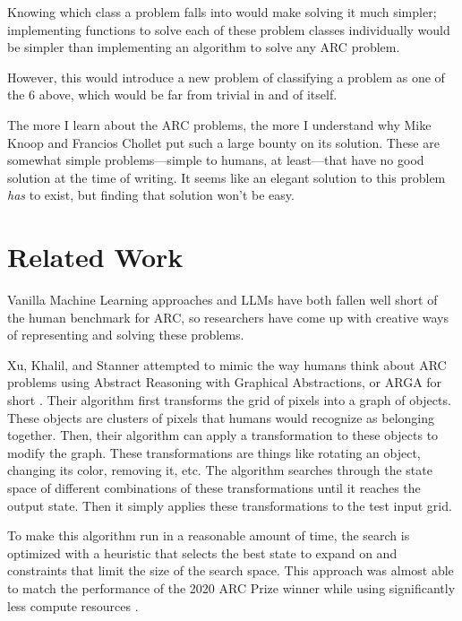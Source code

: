 \documentclass[letterpaper]{article} %
\begin{document}
Knowing which class a problem falls into would make solving it much simpler; implementing functions to solve each of these problem classes individually would be simpler than implementing an algorithm to solve any ARC problem.

However, this would introduce a new problem of classifying a problem as one of the 6 above, which would be far from trivial in and of itself.

\bigskip

The more I learn about the ARC problems, the more I understand why Mike Knoop and Francios Chollet put such a large bounty on its solution. These are somewhat simple problems---simple to humans, at least---that have no good solution at the time of writing. It seems like an elegant solution to this problem \textit{has} to exist, but finding that solution won't be easy.

\section{Related Work}
Vanilla Machine Learning approaches and LLMs have both fallen well short of the human benchmark for ARC, so researchers have come up with creative ways of representing and solving these problems.

\bigskip

Xu, Khalil, and Stanner attempted to mimic the way humans think about ARC problems using Abstract Reasoning with Graphical Abstractions, or ARGA for short \cite{Xu_Khalil_Sanner_2023}. Their algorithm first transforms the grid of pixels into a graph of objects. These objects are clusters of pixels that humans would recognize as belonging together. Then, their algorithm can apply a transformation to these objects to modify the graph. These transformations are things like rotating an object, changing its color, removing it, etc. The algorithm searches through the state space of different combinations of these transformations until it reaches the output state. Then it simply applies these transformations to the test input grid.

To make this algorithm run in a reasonable amount of time, the search is optimized with a heuristic that selects the best state to expand on and constraints that limit the size of the search space. This approach was almost able to match the performance of the 2020 ARC Prize winner while using significantly less compute resources \cite{Xu_Khalil_Sanner_2023}.

\bigskip
\end{document}
